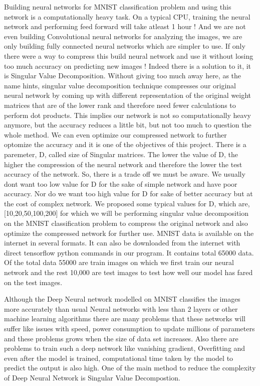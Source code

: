 Building neural networks for MNIST classification problem and using this
network is a computationally heavy task. On a typical CPU, training the neural
network and performing feed forward will take atleast 1 hour ! And we are not
even building Convolutional neural networks for analyzing the images, we are
only building fully connected neural networks which are simpler to use. If
only there were a way to compress this build neural network and use it without
losing too much accuracy on predicting new images ! Indeed there is a solution
to it, it is Singular Value Decomposition. Without giving too much away here,
as the name hints, singular value decomposition technique compresses our
original neural network by coming up with different representation of the
original weight matrices that are of the lower rank and therefore need fewer
calculations to perform dot products. This implies our network is not so
computationally heavy anymore, but the accuracy reduces a little bit, but not
too much to question the whole method. We can even optimize our compressed
network to further optomize the accuracy and it is one of the objectives of
this project. There is a paremeter, D, called size of Singular matrices. The
lower the value of D, the higher the compression of the neural network and
therefore the lower the test accuracy of the network. So, there is a trade off
we must be aware. We usually dont want too low value for D for the sake of
simple network and have poor accuracy. Nor do we want too high value for D for
sake of better accuracy but at the cost of complex network. We proposed some
typical values for D, which are, [10,20,50,100,200] for which we will be
performing singular value decomposition on the MNIST classification problem to
compress the original network and also optimize the compressed network for
further use. MNIST data is available on the internet in several formats. It
can also be downloaded from the internet with direct tensorflow python
commands in our program. It contains total 65000 data. Of the total data 55000
are train images on which we first train  our neural network and the rest
10,000 are test images to test how well our model has fared on the test
images.

Although the Deep Neural network modelled on MNIST classifies the images more
accurately than usual Neural networks with less than 2 layers or other machine
learning algorithms there are many problems that these networks will suffer like
issues with speed, power consumption to update millions of parameters and  these
problems grows when the size of data set increases. Also there are problems to
train such a deep network like vanishing gradient, Overfitting and even after
the model is trained, computational time taken by the model to predict the
output is also high. One of the main method to reduce the complexity of Deep
Neural Network is Singular Value Decompostion.

